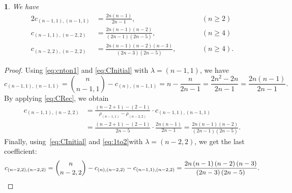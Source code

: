 \documentclass{mathincs}
\numberwithin{equation}{section}
\numberwithin{figure}{section}
\theoremstyle{plain}
\newtheorem{thm}{\protect\theoremname}[section]
\theoremstyle{definition}
\theoremstyle{remark}
\theoremstyle{plain}
\theoremstyle{definition}
\theoremstyle{plain}
\theoremstyle{plain}
\providecommand{\theoremname}{Theorem}
\begin{document}
\begin{thm}
\label{thm:fam1}
We have
\begin{alignat*}{2}
  c_{(n-1,1),(n-1,1)} &= \frac{2n(n-1)}{2n-1}, &\qquad& (n\geq2) \\
  c_{(n-1,1),(n-2,2)} &= \frac{2n(n-1)(n-2)}{(2n-1)(2n-5)}, && (n\geq4) \\
  c_{(n-2,2),(n-2,2)} &= \frac{2n(n-1)(n-2)(n-3)}{(2n-3)(2n-5)}, &&(n\geq4).
\end{alignat*}
\end{thm}
\begin{proof}
Using \eqref{eq:cnton1} and  \eqref{eq:CInitial} with $\lambda=(n-1,1)$, we have
\[
  c_{\left(n-1,1\right),\left(n-1,1\right)}=\binom{n}{n-1,1}-c_{\left(n\right),\left(n-1,1\right)}=n-\frac{n}{2n-1}=\frac{2n^{2}-2n}{2n-1}=\frac{2n\left(n-1\right)}{2n-1}.
\]
By applying \eqref{eq:CRec}, we obtain
\begin{align*}
  c_{\left(n-1,1\right),\left(n-2,2\right)}
  &= \frac{\left(n-2+1\right)-\left(2-1\right)}{\rho_{\left(n-1,1\right)}-\rho_{\left(n-2,2\right)}}\cdot c_{(n-1,1),(n-1,1)}\\
  &= \frac{\left(n-2+1\right)-\left(2-1\right)}{2n-5}\cdot\frac{2n\left(n-1\right)}{2n-1}= \frac{2n\left(n-1\right)\left(n-2\right)}{\left(2n-1\right)\left(2n-5\right)}.
\end{align*}
Finally, using~\eqref{eq:CInitial} and \eqref{eq:1to2}with $\lambda=(n-2,2)$, we get the last coefficient:
\[
 c_{\left(n-2,2\right),\left(n-2,2\right)}=\binom{n}{n-2,2}-c_{\left(n\right),\left(n-2,2\right)}-c_{\left(n-1,1\right),\left(n-2,2\right)}=\frac{2n\left(n-1\right)\left(n-2\right)\left(n-3\right)}{\left(2n-3\right)\left(2n-5\right)}. \qedhere
\]
%
\end{proof}
\end{document}

